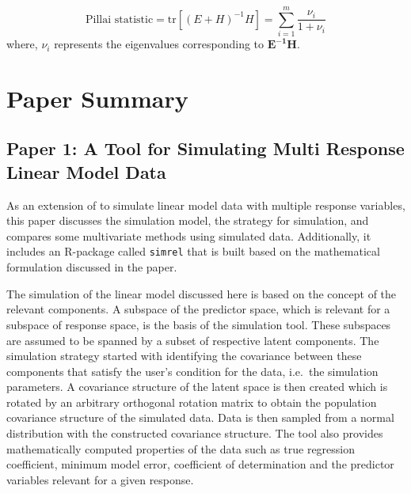 \documentclass[11pt,twoside,openright,titlepage,
  headinclude,footinclude,BCOR=5mm,
  numbers=noenddot,cleardoublepage=empty,
  tablecaptionabove, dottedtoc,
  bibliography=totoc,paper=a4]{scrreprt}
\begin{document}
\begin{equation}
\text{Pillai statistic} = \text{tr}\left[(E + H)^{-1}H\right] = \sum_{i=1}^{m}{\frac{\nu_i}{1+\nu_i}}
\label{eq:pillai}
\end{equation}
where, \(\nu_i\) represents the eigenvalues corresponding to \(\mathbf{E^{-1}H}\).

\hypertarget{paper-summary}{%
\chapter{Paper Summary}\label{paper-summary}}

\hypertarget{paper-1-a-tool-for-simulating-multi-response-linear-model-data}{%
\section{Paper 1: A Tool for Simulating Multi Response Linear Model Data}\label{paper-1-a-tool-for-simulating-multi-response-linear-model-data}}

As an extension of \citet{saebo2015simrel} to simulate linear model data with multiple response variables, this paper discusses the simulation model, the strategy for simulation, and compares some multivariate methods using simulated data. Additionally, it includes an R-package called \texttt{simrel} that is built based on the mathematical formulation discussed in the paper.

The simulation of the linear model discussed here is based on the concept of the relevant components. A subspace of the predictor space, which is relevant for a subspace of response space, is the basis of the simulation tool. These subspaces are assumed to be spanned by a subset of respective latent components. The simulation strategy started with identifying the covariance between these components that satisfy the user's condition for the data, i.e.~the simulation parameters. A covariance structure of the latent space is then created which is rotated by an arbitrary orthogonal rotation matrix to obtain the population covariance structure of the simulated data. Data is then sampled from a normal distribution with the constructed covariance structure. The tool also provides mathematically computed properties of the data such as true regression coefficient, minimum model error, coefficient of determination and the predictor variables relevant for a given response.
\end{document}
